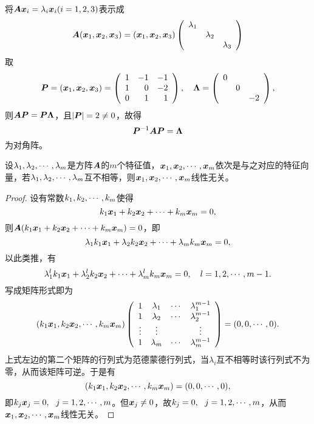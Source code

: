\begin{jie}
将$\A\xx_i=\lambda_i\xx_i(i=1,2,3)$表示成
$$
\A(\xx_1,\xx_2,\xx_3)=(\xx_1,\xx_2,\xx_3)\left(
  \begin{array}{ccc}
    \lambda_1&&\\
    &\lambda_2\\
    &&\lambda_3\\
  \end{array}
\right)
$$
取
$$
\PP=(\xx_1,\xx_2,\xx_3)=\left(
  \begin{array}{rrr}
    1&-1&-1\\
    1& 0&-2\\
    0& 1& 1
  \end{array}
\right), \quad \Lambdabd=\left(
  \begin{array}{rrr}
    0&&\\
     &0&\\
     & &-2
  \end{array}
\right),
$$
则$\A\PP=\PP\Lambdabd$，且$|\PP|=2\ne 0$，故得
$$
\PP^{-1}\A\PP=\Lambdabd
$$
为对角阵。
\end{jie}


\begin{dingli}
  设$\lambda_1,\lambda_2,\cd,\lambda_m$是方阵$\A$的$m$个特征值，$\xx_1,\xx_2,\cd,\xx_m$依次是与之对应的特征向量，若$\lambda_1,\lambda_2,\cd,\lambda_m$互不相等，则$\xx_1,\xx_2,\cd,\xx_m$线性无关。
\end{dingli}
\begin{proof}
  设有常数$k_1,k_2,\cd,k_m$使得
  $$
  k_1\xx_1+k_2\xx_2+\cd+k_m\xx_m=0,
  $$
  则$\A(k_1\xx_1+k_2\xx_2+\cd+k_m\xx_m)=0$，即
  $$
  \lambda_1k_1\xx_1+\lambda_2k_2\xx_2+\cd+\lambda_mk_m\xx_m=0,
  $$
  以此类推，有
  $$
  \lambda_1^lk_1\xx_1+\lambda_2^lk_2\xx_2+\cd+\lambda_m^lk_m\xx_m=0, \quad l=1,2,\cd,m-1.
  $$
  写成矩阵形式即为
  $$
  (k_1\xx_1,k_2\xx_2,\cd,k_m\xx_m)\left(
    \begin{array}{cccc}
      1&\lambda_1&\cd&\lambda_1^{m-1}\\
      1&\lambda_2&\cd&\lambda_2^{m-1}\\
      \vd&\vd&&\vd\\
      1&\lambda_m&\cd&\lambda_m^{m-1}\\
    \end{array}
  \right)=(0,0,\cd,0).
  $$
  上式左边的第二个矩阵的行列式为范德蒙德行列式，当$\lambda_i$互不相等时该行列式不为零，从而该矩阵可逆。于是有
  $$
  (k_1\xx_1,k_2\xx_2,\cd,k_m\xx_m)=(0,0,\cd,0),
  $$
  即$k_j\xx_j=0, ~~j=1,2,\cd,m$。但$\xx_j\ne 0$，故$k_j=0,~~j=1,2,\cd,m$，从而$\xx_1,\xx_2,\cd,\xx_m$线性无关。
\end{proof}

